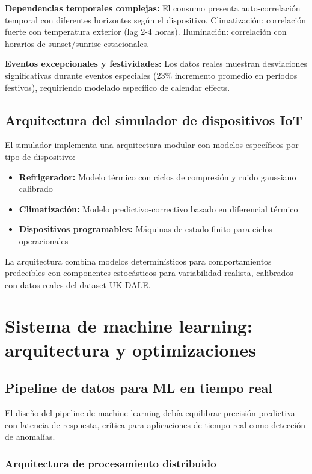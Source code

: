 \textbf{Dependencias temporales complejas:}
El consumo presenta auto-correlación temporal con diferentes horizontes según el dispositivo. Climatización: correlación fuerte con temperatura exterior (lag 2-4 horas). Iluminación: correlación con horarios de sunset/sunrise estacionales.

\textbf{Eventos excepcionales y festividades:}
Los datos reales muestran desviaciones significativas durante eventos especiales (23\% incremento promedio en períodos festivos), requiriendo modelado específico de calendar effects.

\subsection{Arquitectura del simulador de dispositivos IoT}

El simulador implementa una arquitectura modular con modelos específicos por tipo de dispositivo:

\begin{itemize}
    \item \textbf{Refrigerador:} Modelo térmico con ciclos de compresión y ruido gaussiano calibrado
    \item \textbf{Climatización:} Modelo predictivo-correctivo basado en diferencial térmico
    \item \textbf{Dispositivos programables:} Máquinas de estado finito para ciclos operacionales
\end{itemize}

La arquitectura combina modelos determinísticos para comportamientos predecibles con componentes estocásticos para variabilidad realista, calibrados con datos reales del dataset UK-DALE.

\section{Sistema de machine learning: arquitectura y optimizaciones}

\subsection{Pipeline de datos para ML en tiempo real}

El diseño del pipeline de machine learning debía equilibrar precisión predictiva con latencia de respuesta, crítica para aplicaciones de tiempo real como detección de anomalías.

\subsubsection{Arquitectura de procesamiento distribuido}


